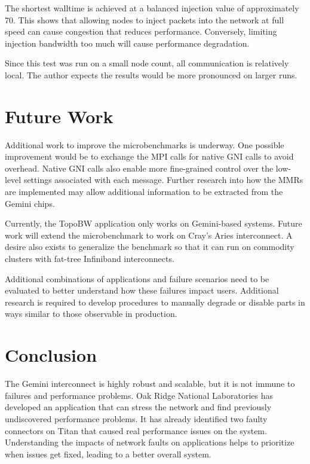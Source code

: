 \documentclass[10pt, conference, compsocconf]{IEEEtran}
\begin{document}
The shortest walltime is achieved at a balanced injection value of
approximately 70.  This shows that allowing nodes to inject packets into the
network at full speed can cause congestion that reduces performance.
Conversely, limiting injection bandwidth too much will cause performance
degradation.

Since this test was run on a small node count, all communication is relatively
local.  The author expects the results would be more pronounced on larger runs.

\section{Future Work}

Additional work to improve the microbenchmarks is underway.  One possible
improvement would be to exchange the MPI calls for native GNI calls to avoid
overhead.  Native GNI calls also enable more fine-grained control over the
low-level settings associated with each message.  Further research into how the
MMRs are implemented may allow additional information to be extracted from the
Gemini chips.

Currently, the TopoBW application only works on Gemini-based systems.  Future
work will extend the microbenchmark to work on Cray's Aries interconnect.  A
desire also exists to generalize the benchmark so that it can run on commodity
clusters with fat-tree Infiniband interconnects.

Additional combinations of applications and failure scenarios need to be
evaluated to better understand how these failures impact users.  Additional
research is required to develop procedures to manually degrade or disable parts
in ways similar to those observable in production.

\section{Conclusion}

The Gemini interconnect is highly robust and scalable, but it is not immune to
failures and performance problems.  Oak Ridge National Laboratories has
developed an application that can stress the network and find previously
undiscovered performance problems.  It has already identified two faulty
connectors on Titan that caused real performance issues on the system.
Understanding the impacts of network faults on applications helps to prioritize
when issues get fixed, leading to a better overall system.
\end{document}
